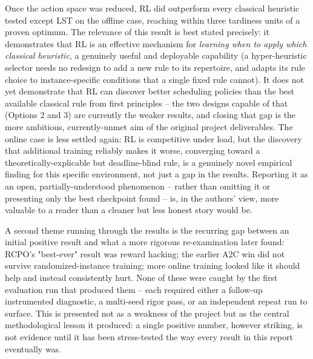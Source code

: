 \documentclass[12pt]{article}
\begin{document}
Once the action space was reduced, RL did outperform every classical heuristic tested except LST on the offline case, reaching within three tardiness units of a proven optimum. The relevance of this result is best stated precisely: it demonstrates that RL is an effective mechanism for \emph{learning when to apply which classical heuristic}, a genuinely useful and deployable capability (a hyper-heuristic selector needs no redesign to add a new rule to its repertoire, and adapts its rule choice to instance-specific conditions that a single fixed rule cannot). It does not yet demonstrate that RL can discover better scheduling policies than the best available classical rule from first principles -- the two designs capable of that (Options 2 and 3) are currently the weaker results, and closing that gap is the more ambitious, currently-unmet aim of the original project deliverables. The online case is less settled again: RL is competitive under load, but the discovery that additional training reliably makes it worse, converging toward a theoretically-explicable but deadline-blind rule, is a genuinely novel empirical finding for this specific environment, not just a gap in the results. Reporting it as an open, partially-understood phenomenon -- rather than omitting it or presenting only the best checkpoint found -- is, in the authors' view, more valuable to a reader than a cleaner but less honest story would be.

A second theme running through the results is the recurring gap between an initial positive result and what a more rigorous re-examination later found: RCPO's "best-ever" result was reward hacking; the earlier A2C win did not survive randomized-instance training; more online training looked like it should help and instead consistently hurt. None of these were caught by the first evaluation run that produced them -- each required either a follow-up instrumented diagnostic, a multi-seed rigor pass, or an independent repeat run to surface. This is presented not as a weakness of the project but as the central methodological lesson it produced: a single positive number, however striking, is not evidence until it has been stress-tested the way every result in this report eventually was.
\end{document}
